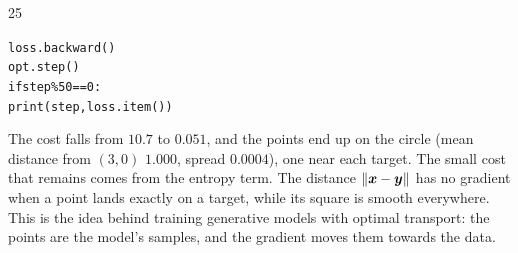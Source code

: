 \documentclass{sotonExamBoxes}    %
\begin{document}
\begin{question}{25}
\begin{qparts}
{\begin{answer}
\begin{alltt}
\hspace*{2em}loss.backward()\\
\hspace*{2em}opt.step()\\
\hspace*{2em}if step \% 50 == 0:\\
\hspace*{4em}print(step, loss.item())
\end{alltt}
        The cost falls from $10.7$ to $0.051$, and the points end up on
        the circle (mean distance from $(3,0)$ $1.000$, spread $0.0004$),
        one near each target.  The small cost that remains comes from the
        entropy term.  The distance $\| \bm{x}-\bm{y} \|$ has no gradient
        when a point lands exactly on a target, while its square is smooth
        everywhere.  This is the idea behind training generative models
        with optimal transport: the points are the model's samples, and
        the gradient moves them towards the data.
      \end{answer}}{}

  \end{qparts}
\end{question}
\end{document}

